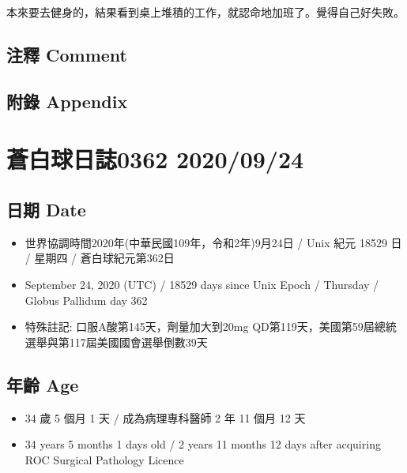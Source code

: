 \documentclass[
]{article}
\providecommand{\tightlist}{%
  \setlength{\itemsep}{0pt}\setlength{\parskip}{0pt}}
\begin{document}
本來要去健身的，結果看到桌上堆積的工作，就認命地加班了。覺得自己好失敗。

\hypertarget{ux6ce8ux91cb-comment-22}{%
\subsection{注釋 Comment}\label{ux6ce8ux91cb-comment-22}}

\hypertarget{ux9644ux9304-appendix-22}{%
\subsection{附錄 Appendix}\label{ux9644ux9304-appendix-22}}

\hypertarget{ux84bcux767dux7403ux65e5ux8a8c0362-20200924}{%
\section{蒼白球日誌0362
2020/09/24}\label{ux84bcux767dux7403ux65e5ux8a8c0362-20200924}}

\hypertarget{ux65e5ux671f-date-23}{%
\subsection{日期 Date}\label{ux65e5ux671f-date-23}}

\begin{itemize}
\tightlist
\item
  世界協調時間2020年(中華民國109年，令和2年)9月24日 / Unix 紀元 18529 日
  / 星期四 / 蒼白球紀元第362日
\item
  September 24, 2020 (UTC) / 18529 days since Unix Epoch / Thursday /
  Globus Pallidum day 362
\item
  特殊註記: 口服A酸第145天，劑量加大到20mg
  QD第119天，美國第59屆總統選舉與第117屆美國國會選舉倒數39天
\end{itemize}

\hypertarget{ux5e74ux9f61-age-23}{%
\subsection{年齡 Age}\label{ux5e74ux9f61-age-23}}

\begin{itemize}
\tightlist
\item
  34 歲 5 個月 1 天 / 成為病理專科醫師 2 年 11 個月 12 天
\item
  34 years 5 months 1 days old / 2 years 11 months 12 days after
  acquiring ROC Surgical Pathology Licence
\end{itemize}
\end{document}

